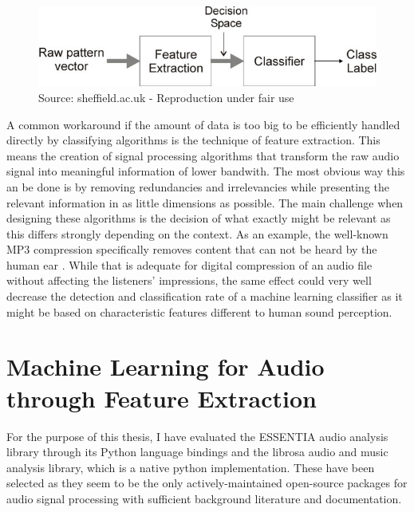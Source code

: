 \begin{figure}[h]
    \centering
	\includegraphics[width=.8\textwidth]{./images/illustrations/pipeline-fe}
    \caption{Source: sheffield.ac.uk - Reproduction under fair use}
    \label{fig:pipeline-fe}
\end{figure}


A common workaround if the amount of data is too big to be efficiently handled directly by classifying algorithms is the technique of feature extraction. This means the creation of signal processing algorithms that transform the raw audio signal into meaningful information of lower bandwith. The most obvious way this an be done is by removing redundancies and irrelevancies while presenting the relevant information in as little dimensions as possible. The main challenge when designing these algorithms is the decision of what exactly might be relevant as this differs strongly depending on the context.
As an example, the well-known MP3 compression specifically removes content that can not be heard by the human ear \cite{brandenburg1999mp3}. While that is adequate for digital compression of an audio file without affecting the listeners' impressions, the same effect could very well decrease the detection and classification rate of a machine learning classifier as it might be based on characteristic features different to human sound perception.  


\section{Machine Learning for Audio through Feature Extraction}







For the purpose of this thesis, I have evaluated the ESSENTIA audio analysis library \cite{bogdanov:Essentia:ACMMULTIMEDIA13} through its Python language bindings and the librosa audio and music analysis library\cite{BMcFee:librosa}, which is a native python implementation. 
These have been selected as they seem to be the only actively-maintained open-source packages for audio signal processing with sufficient background literature and documentation. 

